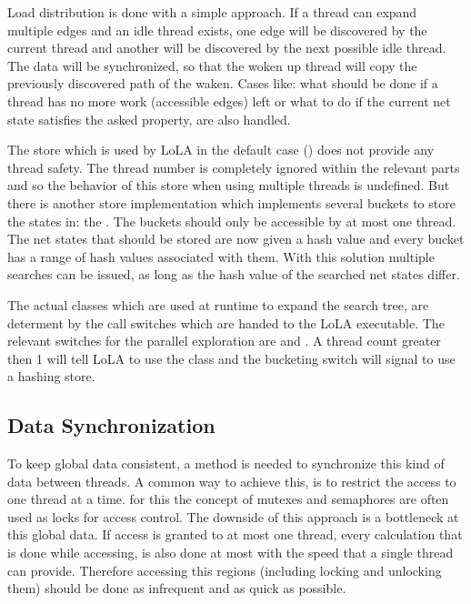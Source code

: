 Load distribution is done with a simple approach. If a thread can expand multiple edges and an idle thread exists, one edge will be discovered by the current thread and another will be discovered by the next possible idle thread. The data will be synchronized, so that the woken up thread will copy the previously discovered path of the waken. Cases like: what should be done if a thread has no more work (accessible edges) left or what to do if the current net state satisfies the asked property, are also handled.

The store which is used by LoLA in the default case () does not provide any thread safety. The thread number is completely ignored within the relevant parts and so the behavior of this store when using multiple threads is undefined. But there is another store implementation which implements several buckets to store the states in: the . The buckets should only be accessible by at most one thread. The net states that should be stored are now given a hash value and every bucket has a range of hash values associated with them. With this solution multiple searches can be issued, as long as the hash value of the searched net states differ.

The actual classes which are used at runtime to expand the search tree, are determent by the call switches which are handed to the LoLA executable. The relevant switches for the parallel exploration are  and . A thread count greater then 1 will tell LoLA to use the  class and the bucketing switch will signal to use a hashing store.

\subsection{Data Synchronization}
To keep global data consistent, a method is needed to synchronize this kind of data between threads. A common way to achieve this, is to restrict the access to one thread at a time. for this the concept of mutexes and semaphores are often used as locks for access control. The downside of this approach is a bottleneck at this global data. If access is granted to at most one thread, every calculation that is done while accessing, is also done at most with the speed that a single thread can provide. Therefore accessing this regions (including locking and unlocking them) should be done as infrequent and as quick as possible.

